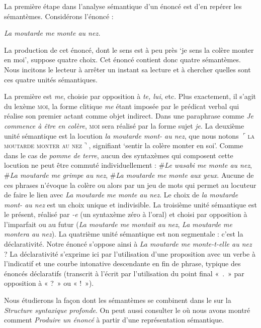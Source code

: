 La première étape dans l’analyse sémantique d’un énoncé est d’en repérer les sémantèmes. Considérons l’énoncé :

\ea\itshape La moutarde me monte au nez.\z

La production de cet énoncé, dont le sens est à peu près ‘je sens la colère monter en moi’, suppose quatre choix. Cet énoncé contient donc quatre sémantèmes. Nous incitons le lecteur à arrêter un instant sa lecture et à chercher quelles sont ces quatre unités sémantiques.

La première est \textit{me}, choisie par opposition à \textit{te, lui}, etc. Plus exactement, il s’agit du lexème \textsc{moi}, la forme clitique \textit{me} étant imposée par le prédicat verbal qui réalise son premier actant comme objet indirect. Dans une paraphrase comme \textit{Je commence à être en colère}, \textsc{moi} sera réalisé par la forme sujet \textit{je}. La deuxième unité sémantique est la locution \textit{la moutarde mont- au nez}, que nous notons $⌜$\textsc{la} \textsc{moutarde} \textsc{monter} \textsc{au} \textsc{nez}$⌝$, signifiant ‘sentir la colère monter en soi’. Comme dans le cas de \textit{pomme de terre}, aucun des syntaxèmes qui composent cette locution ne peut être commuté individuellement : \#\textit{Le wasabi me monte au nez}, \#\textit{La moutarde me grimpe au nez}, \#\textit{La moutarde me monte aux yeux}. Aucune de ces phrases n’évoque la colère ou alors par un jeu de mots qui permet au locuteur de faire le lien avec \textit{La moutarde me monte au nez}. Le choix de \textit{la moutarde mont- au nez} est un choix unique et indivisible. La troisième unité sémantique est le présent, réalisé par \textit{{}-e} (un syntaxème zéro à l’oral) et choisi par opposition à l’imparfait ou au futur (\textit{La moutarde me montait au nez}, \textit{La moutarde me montera au nez}). La quatrième unité sémantique est non segmentale : c’est la déclarativité. Notre énoncé s’oppose ainsi à \textit{La moutarde me monte-t-elle au nez} ? La déclarativité s’exprime ici par l’utilisation d’une proposition avec un verbe à l’indicatif et une courbe intonative descendante en fin de phrase, typique des énoncés déclaratifs (transcrit à l’écrit par l’utilisation du point final «~.~» par opposition à « ?~» ou « !~»).

Nous étudierons la façon dont les sémantèmes se combinent dans le  sur la \textit{Structure syntaxique profonde}. On peut aussi consulter le  où nous avons montré comment \textit{Produire un énoncé} à partir d’une représentation sémantique.

